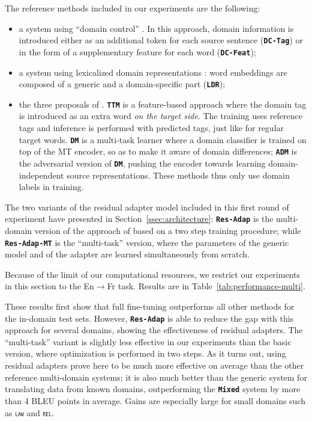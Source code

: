 \documentclass[11pt,a4paper]{article}
\newcommand{\domain}[1]{\texttt{\textsc{#1}}}
\newcommand{\system}[1]{\texttt{\textbf{#1}}}
\begin{document}
The reference methods included in our experiments are the following:
\begin{itemize}
\item a system using ``domain control'' \cite{Kobus17domaincontrol}. In this approach, domain information is introduced either as an additional token for each source sentence (\system{DC-Tag}) or in the form of a supplementary feature for each word (\system{DC-Feat});
\item a system using lexicalized domain representations \cite{Pham19generic}: word embeddings are composed of a generic and a domain-specific part (\system{LDR});
\item the three proposals of . \system{TTM} is a feature-based approach where the domain tag is introduced as an extra word \textsl{on the target side}. The training uses reference tags and inference is performed with predicted tags, just like for regular target words. \system{DM} is a multi-task learner where a domain classifier is trained on top of the MT encoder, so as to make it aware of domain differences; \system{ADM} is the adversarial version of \system{DM}, pushing the encoder towards learning domain-independent source representations. These methods thus only use domain labels in training.
\end{itemize}

The two variants of the residual adapter model included in this first round of experiment have presented in Section~\ref{ssec:architecture}: \system{Res-Adap} is the multi-domain version of the approach of \citet{Bapna19simple} based on a two step training procedure; while \system{Res-Adap-MT} is the ``multi-task'' version, where the parameters of the generic model and of the adapter  are learned simultaneously from scratch.

Because of the limit of our computational resources, we restrict our experiments in this section to the En$\rightarrow$Fr task. Results are in Table~\ref{tab:performance-multi}.

These results first show that full fine-tuning outperforms all other methods for the in-domain test sets. However, \system{Res-Adap} is able to reduce the gap with this approach for several domains, showing the effectiveness of residual adapters. The ``multi-task'' variant is slightly less effective in our experiments than the basic version, where optimization is performed in two steps. As it turns out, using residual adapters prove here to be much more effective on average than the other reference multi-domain systems; it is also much better than the generic system for translating data from known domains, outperforming the \system{Mixed} system by more than 4 BLEU points in average. Gains are especially large for small domains such as \domain{law} and \domain{rel}.
\end{document}
